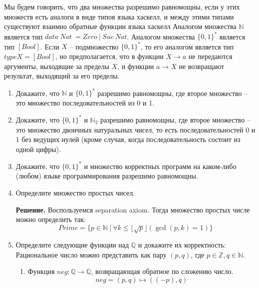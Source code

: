 \def\doubleunderline#1{\underline{\underline{#1}}}

Мы будем говорить, что два множества разрешимо равномощны, если у этих множеств есть аналоги в виде типов языка хаскелл,
    и между этими типами существуют взаимно обратные функции языка хаскелл
Аналогом множества $\mathbb{N}$ является тип $data\ Nat\ = Zero\ |\ Suc\ Nat$.
Аналогом множества $\{0,1\}^*$ является тип $[Bool]$.
Если $X$ -- подмножество $\{0,1\}^*$, то его аналогом является тип $type X = [Bool]$, но предполагается,
    что в функции $X \to a$ не передаются аргументы, выходящие за пределы $X$, и функции $a \to X$ не возвращают результат, выходящий за его пределы.

\begin{enumerate}

\item Докажите, что $\mathbb{N}$ и $\{0,1\}^*$ разрешимо равномощны, где второе множество -- это множество последовательностей из 0 и 1.

\item Докажите, что $\{0,1\}^*$ и $\mathbb{N}_2$ разрешимо равномощны, где второе множество -- это 
множество двоичных натуральных чисел,
    то есть последовательностей 0 и 1 без ведущих нулей (кроме случая, когда последовательность состоит из одной цифры).

\item Докажите, что $\{0,1\}^*$ и множество корректных программ на каком-либо (любом) языке программирования разрешимо равномощны.

\item Определите множество простых чисел.

\textbf{Решение.} Воспользуемся separation axiom. Тогда множество простых числе можно определить так:
\begin{equation*}
	Prime = \{p \in \mathbb{N} \ | \ \forall k \leqslant \lfloor \sqrt{p} \rfloor (\gcd(p, k) = 1) \}
\end{equation*}

\item Определите следующие функции над $\mathbb{Q}$ и докажите их корректность:
Рациональное число можно представить как пару $(p, q)$, где $p \in \mathbb{Z}, q \in \mathbb{N}$. 
\begin{enumerate}
\item Функция $neg : \mathbb{Q} \to \mathbb{Q}$, возвращающая обратное по сложению число.
\begin{equation*}
	neg = (p, q) \mapsto ((-p), q)
\end{equation*}


\end{enumerate}
\end{enumerate}
